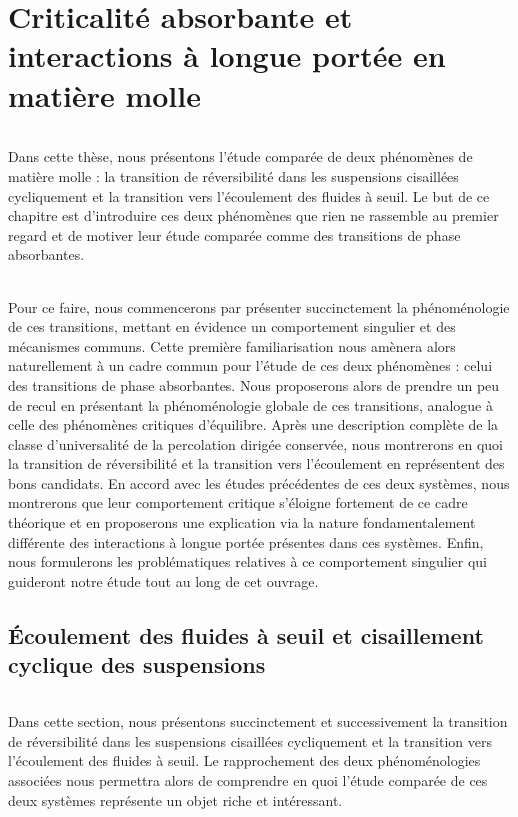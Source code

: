 \chapter{Criticalité absorbante et interactions à longue portée en matière molle}

\label{chapter:introduction}

\subparagraph{}Dans cette thèse, nous présentons l'étude comparée de deux phénomènes de matière molle : la transition de réversibilité dans les suspensions cisaillées cycliquement et la transition vers l'écoulement des fluides à seuil. Le but de ce chapitre est d'introduire ces deux phénomènes que rien ne rassemble au premier regard et de motiver leur étude comparée comme des transitions de phase absorbantes.

\subparagraph{}Pour ce faire, nous commencerons par présenter succinctement la phénoménologie de ces transitions, mettant en évidence un comportement singulier et des mécanismes communs. Cette première familiarisation nous amènera alors naturellement à un cadre commun pour l'étude de ces deux phénomènes : celui des transitions de phase absorbantes. Nous proposerons alors de prendre un peu de recul en présentant la phénoménologie globale de ces transitions, analogue à celle des phénomènes critiques d'équilibre. Après une description complète de la classe d'universalité de la percolation dirigée conservée, nous montrerons en quoi la transition de réversibilité et la transition vers l'écoulement en représentent des bons candidats. En accord avec les études précédentes de ces deux systèmes, nous montrerons que leur comportement critique s'éloigne fortement de ce cadre théorique et en proposerons une explication via la nature fondamentalement différente des interactions à longue portée présentes dans ces systèmes. Enfin, nous formulerons les problématiques relatives à ce comportement singulier qui guideront notre étude tout au long de cet ouvrage.

\section{Écoulement des fluides à seuil et cisaillement cyclique des suspensions}

\subparagraph{}Dans cette section, nous présentons succinctement et successivement la transition de réversibilité dans les suspensions cisaillées cycliquement et la transition vers l'écoulement des fluides à seuil. Le rapprochement des deux phénoménologies associées nous permettra alors de comprendre en quoi l'étude comparée de ces deux systèmes représente un objet riche et intéressant.

